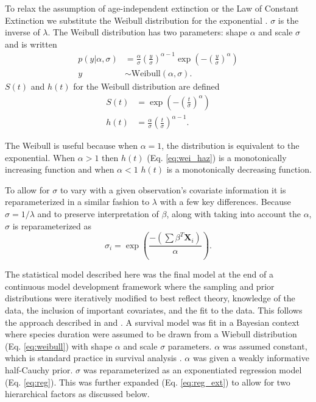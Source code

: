 \documentclass[12pt,letterpaper]{article}
\begin{document}
To relax the assumption of age-independent extinction or the Law of Constant Extinction we substitute the Weibull distribution for the exponential \citep{Klein2003}. \(\sigma\) is the inverse of \(\lambda\). The Weibull distribution has two parameters: shape \(\alpha\) and scale \(\sigma\) and is written
\begin{align}
  p(y | \alpha, \sigma) &= \frac{\alpha}{\sigma} \left(\frac{y}{\sigma}\right)^{\alpha - 1} \exp\left(-\left(\frac{y}{\sigma}\right)^{\alpha}\right) \nonumber \\
  y &\sim \mathrm{Weibull}(\alpha, \sigma).
  \label{eq:weibull}
\end{align}
\(S(t)\) and \(h(t)\) for the Weibull distribution are defined
\begin{align}
  S(t) &= \exp\left(-\left(\frac{t}{\sigma}\right)^{\alpha}\right) \label{eq:wei_surv} \\
  h(t) &= \frac{\alpha}{\sigma}\left(\frac{t}{\sigma}\right)^{\alpha - 1} \label{eq:wei_haz}.
\end{align}

The Weibull is useful because when \(\alpha = 1\), the distribution is equivalent to the exponential. When \(\alpha > 1\) then \(h(t)\) (Eq. \ref{eq:wei_haz}) is a monotonically increasing function and when \(\alpha < 1\) \(h(t)\) is a monotonically decreasing function.

To allow for \(\sigma\) to vary with a given observation's covariate information it is reparameterized in a similar fashion to \(\lambda\) with a few key differences. Because \(\sigma = 1/\lambda\) and to preserve interpretation of \(\beta\), along with taking into account the \(\alpha\), \(\sigma\) is reparameterized as
\begin{equation}
  \sigma_{i} = \exp\left(\frac{-(\sum \beta^{T}\mathbf{X}_{i})}{\alpha}\right).
  \label{eq:reg}
\end{equation}

The statistical model described here was the final model at the end of a continuous model development framework where the sampling and prior distributions were iteratively modified to best reflect theory, knowledge of the data, the inclusion of important covariates, and the fit to the data. This follows the approach described in \citet{Gelman2007} and \citet{Gelman2013d}.
A survival model was fit in a Bayesian context where species duration were assumed to be drawn from a Wiebull distribution (Eq. \ref{eq:weibull}) with shape \(\alpha\) and scale \(\sigma\) parameters. \(\alpha\) was assumed constant, which is standard practice in survival analysis \citep{Klein2003}. \(\alpha\) was given a weakly informative half-Cauchy prior. \(\sigma\) was reparameterized as an exponentiated regression model (Eq. \ref{eq:reg}). This was further expanded (Eq. \ref{eq:reg_ext}) to allow for two hierarchical factors as discussed below. 
\end{document}
